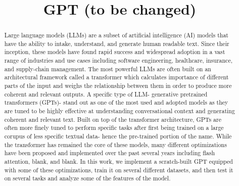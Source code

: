 \documentclass[conference]{IEEEtran}
\begin{document}
\title{GPT (to be changed)}

\author{
\and
{}
\and
{}
\and
{}
\and
{}
\and
{}
}

\maketitle

\begin{abstract}
Large language models (LLMs) are a subset of artificial intelligence (AI)
models that have the ability to intake, understand, and generate human 
readable text. Since their inception, these models have found rapid success and widespread adoption in a vast range of industries and 
use cases including software engineering, healthcare, insurance, 
and supply-chain management. The most powerful LLMs are often built on 
an architectural framework called a transformer which calculates importance of different parts of the input and weighs the relationship between 
them in order to produce more coherent and relevant outputs. A specific type of LLM- generative pretrained 
transformers (GPTs)- stand out as one of the most used and adopted models as
they are tuned to be highly effective at understanding conversational 
context and generating coherent and relevant text. Built on top of the transformer architecture, GPTs are often more
finely tuned to perform specific tasks after
first being trained on a large corupus of less specific textual data- hence the pre-trained portion of the name. While the transformer has remained the 
core of these models, many different optimizations have been proposed and 
implemented over the past several years including flash attention, blank, and blank. In this work, we implement a scratch-built GPT equipped with some 
of these optimizations, train it on several different datasets, and then test 
it on several tasks and analyze some of the features of the model. 
\end{abstract}
\end{document}
